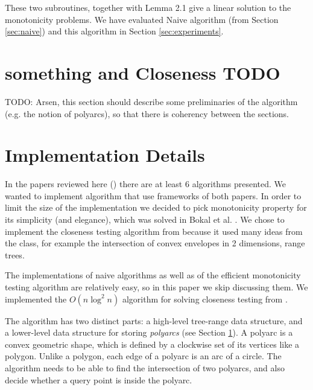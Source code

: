 \documentclass{article}
\begin{document}
These two subroutines, together with Lemma 2.1 give a linear solution
to the monotonicity problems. We have evaluated Naive algorithm
(from Section \ref{sec:naive}) and this algorithm in Section
\ref{sec:experiments}.



\section{something and Closeness TODO}
\label{sec:closeness}
TODO: Arsen, this section should describe some preliminaries of the algorithm (e.g. the notion of polyarcs), so that there is coherency between the sections.

\section{Implementation Details}
\label{sec:implementation}
In the papers reviewed here (\cite{bokal2015,chan2016}) there are at least 6 algorithms presented. We wanted to implement algorithm that use frameworks of both papers. In order to limit the size of the implementation we decided to pick monotonicity property for its simplicity (and elegance), which was solved in Bokal et al. \cite{bokal2015}. We chose to implement the closeness testing algorithm from \cite{chan2016} because it used many ideas from the class, for example the intersection of convex envelopes in 2 dimensions, range trees.

The implementations of naive algorithms as well as of the efficient monotonicity testing algorithm are relatively easy, so in this paper we skip discussing them. We implemented the $O(n \log ^2 n)$ algorithm for solving closeness testing from \cite{chan2016}.

The algorithm has two distinct parts: a high-level tree-range data structure, and a lower-level data structure for storing \textit{polyarcs} (see Section \ref{sec:closeness}). A polyarc is a convex geometric shape, which is defined by a clockwise set of its vertices like a polygon. Unlike a polygon, each edge of a polyarc is an arc of a circle. The algorithm needs to be able to find the intersection of two polyarcs, and also decide whether a query point is inside the polyarc.
\end{document}
